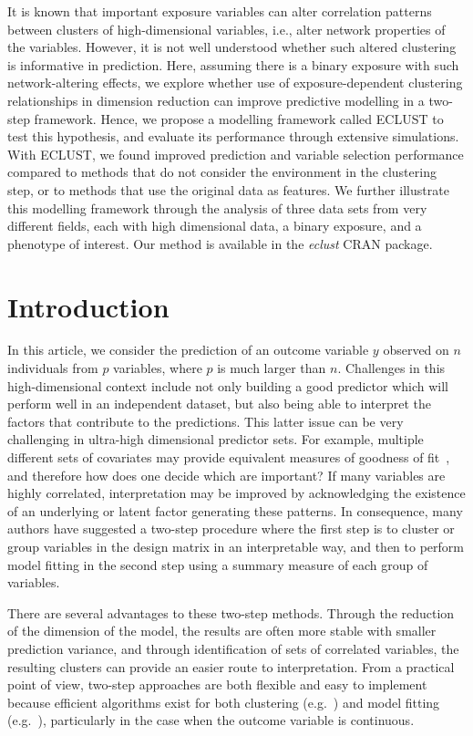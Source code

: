It is known that important exposure variables can alter correlation patterns between clusters of high-dimensional variables, i.e., alter network properties of the variables. However, it is not well understood whether such altered clustering is informative in prediction. Here, assuming there is a binary exposure with such network-altering effects, we explore whether use of exposure-dependent clustering relationships in dimension reduction can improve predictive modelling in a two-step framework. Hence, we propose a modelling framework called ECLUST to test this hypothesis, and evaluate its performance through extensive simulations.\\

With ECLUST, we found improved prediction and variable selection performance compared to methods that do not consider the environment in the clustering step, or to methods that use the original data as features.  We further illustrate this modelling framework through the analysis of three data sets from very different fields, each with high dimensional data, a binary exposure, and a phenotype of interest. Our method is available in the \emph{eclust} CRAN package.

\newpage

\section{Introduction}
In this article, we consider the prediction of an outcome variable $y$ observed on $n$ individuals from $p$ variables, where $p$ is much larger than $n$. Challenges in this high-dimensional context include not only building a good predictor which will perform well in an independent dataset, but also being able to interpret the factors that contribute to the predictions. This latter issue can be very challenging in ultra-high dimensional predictor sets. For example, multiple different sets of covariates may provide equivalent measures of goodness of fit~\citep{fan2014challenges}, and therefore how does one decide which are important? If many variables are highly correlated, interpretation may be improved by acknowledging the existence of an underlying or latent factor generating these patterns. In consequence, many authors have suggested a two-step procedure where the first step is to cluster or group variables in the design matrix in an interpretable way, and then to perform  model fitting in the second step using a summary measure of each group of variables.

There are several advantages to these two-step methods.  Through the reduction of the dimension of the model, the results are often more stable with smaller prediction variance, and through identification of sets of correlated variables, the resulting clusters can provide an easier route to interpretation. From a practical point of view, two-step approaches are both flexible and easy to implement because efficient algorithms exist for both clustering (e.g.~\citep{fastclust}) and model fitting (e.g.~\citep{friedman2010regularization,gglasso,kuhn2008caret}), particularly in the case when the outcome variable is continuous. 

